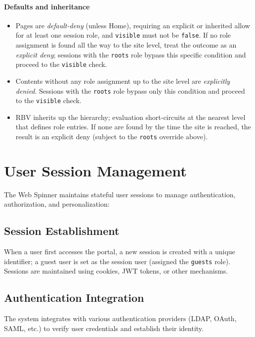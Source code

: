 \paragraph{Defaults and inheritance}
\begin{itemize}
		\item Pages are \emph{default-deny} (unless Home), requiring an explicit or inherited allow for at least one session role, and \texttt{visible} must not be \texttt{false}. If no role assignment is found all the way to the site level, treat the outcome as an \emph{explicit deny}; sessions with the \texttt{roots} role bypass this specific condition and proceed to the \texttt{visible} check.
		\item Contents without any role assignment up to the site level are \emph{explicitly denied}. Sessions with the \texttt{roots} role bypass only this condition and proceed to the \texttt{visible} check.
		\item RBV inherits up the hierarchy; evaluation short-circuits at the nearest level that defines role entries. If none are found by the time the site is reached, the result is an explicit deny (subject to the \texttt{roots} override above).
\end{itemize}

\section{User Session Management}
\label{sec:session-management}

The Web Spinner maintains stateful user sessions to manage authentication, authorization, and personalization:

\subsection{Session Establishment}

When a user first accesses the portal, a new session is created with a unique identifier; a guest user is set as the session user (assigned the \texttt{guests} role). Sessions are maintained using cookies, JWT tokens, or other mechanisms.

\subsection{Authentication Integration}

The system integrates with various authentication providers (LDAP, OAuth, SAML, etc.) to verify user credentials and establish their identity.

